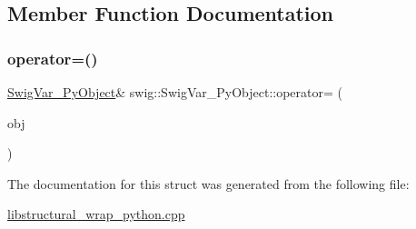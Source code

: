 \subsection{Member Function Documentation}
\mbox{\label{structswig_1_1_swig_var___py_object_a7e6053b64cf6e787b99a67b09cdc6d89}} 
\subsubsection{\texorpdfstring{operator=()}{operator=()}}
{\footnotesize\ttfamily \hyperlink{structswig_1_1_swig_var___py_object}{Swig\+Var\+\_\+\+Py\+Object}\& swig\+::\+Swig\+Var\+\_\+\+Py\+Object\+::operator= (\begin{DoxyParamCaption}\item[{Py\+Object $\ast$}]{obj }\end{DoxyParamCaption})\hspace{0.3cm}{\ttfamily [inline]}}



The documentation for this struct was generated from the following file\+:\begin{DoxyCompactItemize}
\item 
\hyperlink{libstructural__wrap__python_8cpp}{libstructural\+\_\+wrap\+\_\+python.\+cpp}\end{DoxyCompactItemize}
